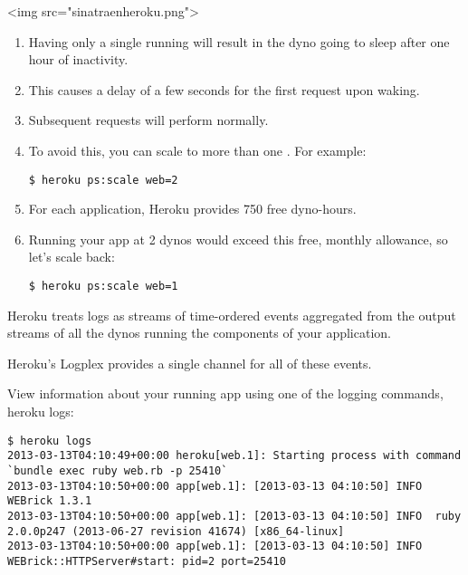 \begin{rawhtml}
<img src="sinatraenheroku.png">
\end{rawhtml}


\begin{enumerate}
\item 
Having only a single  running will result in the dyno going
to sleep after one hour of inactivity. 

\item 
This causes a delay of a few
seconds for the first request upon waking. 

\item 
Subsequent requests will
perform normally.

\item 
To avoid this, you can scale to more than one . For example:
\begin{verbatim}
$ heroku ps:scale web=2
\end{verbatim}
\item 
For each application, Heroku provides 750 free dyno-hours. 

\item 
Running
your app at 2 dynos would exceed this free, monthly allowance, so
let’s scale back:
\begin{verbatim}
$ heroku ps:scale web=1
\end{verbatim}
\end{enumerate}


Heroku treats logs as streams of time-ordered events aggregated
from the output streams of all the dynos running the components of
your application. 

Heroku’s Logplex provides a single channel for
all of these events.

View information about your running app using one of the logging commands, heroku logs:
\begin{verbatim}
$ heroku logs
2013-03-13T04:10:49+00:00 heroku[web.1]: Starting process with command `bundle exec ruby web.rb -p 25410`
2013-03-13T04:10:50+00:00 app[web.1]: [2013-03-13 04:10:50] INFO  WEBrick 1.3.1
2013-03-13T04:10:50+00:00 app[web.1]: [2013-03-13 04:10:50] INFO  ruby 2.0.0p247 (2013-06-27 revision 41674) [x86_64-linux]
2013-03-13T04:10:50+00:00 app[web.1]: [2013-03-13 04:10:50] INFO  WEBrick::HTTPServer#start: pid=2 port=25410
\end{verbatim}

